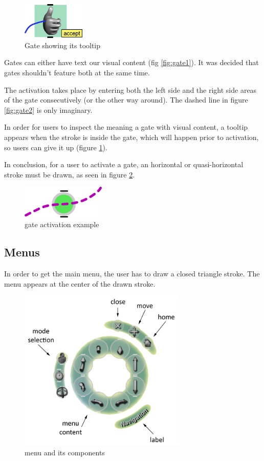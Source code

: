 \begin{figure}[!ht]
		\vspace{-0.7cm}
		\centering
		\includegraphics[width=3cm]{gfx/gate3e.png}
		\vspace{-0.5cm}
		\caption{Gate showing its tooltip}
		\label{fig:gate3}
\end{figure}


Gates can either have text our visual content (fig \ref{fig:gate1}).
It was decided that gates shouldn't feature both at the same time.

The activation takes place by entering both the left side and the right
side areas of the gate consecutively (or the other way around).
The dashed line in figure \ref{fig:gate2} is only imaginary.

In order for users to inspect the meaning a gate with visual content, a
tooltip appears when the stroke is inside the gate,
which will happen prior to activation, so users can give it up (figure \ref{fig:gate3}).

In conclusion, for a user to activate a gate, an horizontal or quasi-horizontal
stroke must be drawn, as seen in figure \ref{fig:gate4}.

\begin{figure}[!ht]
		\centering
		\includegraphics[width=4cm]{gfx/activation.png}
		\caption{gate activation example}
		\label{fig:gate4}
\end{figure}

\subsection{Menus}

In order to get the main menu, the user has to draw a closed triangle stroke.
The menu appears at the center of the drawn stroke.

\begin{figure}[!ht]
		\centering
		\includegraphics[width=8cm]{gfx/menu.png}
		\caption{menu and its components}
		\label{fig:menu}
\end{figure}

